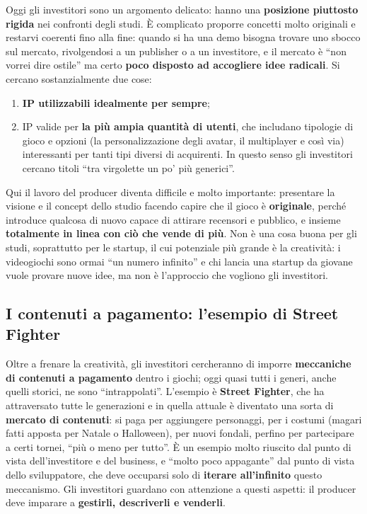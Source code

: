 Oggi gli investitori sono un argomento delicato: hanno una \textbf{posizione
piuttosto rigida} nei confronti degli studi. È complicato proporre concetti
molto originali e restarvi coerenti fino alla fine: quando si ha una demo
bisogna trovare uno sbocco sul mercato, rivolgendosi a un publisher o a un
investitore, e il mercato è ``non vorrei dire ostile'' ma certo \textbf{poco
disposto ad accogliere idee radicali}. Si cercano sostanzialmente due cose:
\begin{enumerate}
  \item \textbf{IP utilizzabili idealmente per sempre};
  \item IP valide per \textbf{la più ampia quantità di utenti}, che includano
        tipologie di gioco e opzioni (la personalizzazione degli avatar, il
        multiplayer e così via) interessanti per tanti tipi diversi di
        acquirenti. In questo senso gli investitori cercano titoli ``tra
        virgolette un po' più generici''.
\end{enumerate}
Qui il lavoro del producer diventa difficile e molto importante: presentare la
visione e il concept dello studio facendo capire che il gioco è
\textbf{originale}, perché introduce qualcosa di nuovo capace di attirare
recensori e pubblico, e insieme \textbf{totalmente in linea con ciò che vende di
più}. Non è una cosa buona per gli studi, soprattutto per le startup, il cui
potenziale più grande è la creatività: i videogiochi sono ormai ``un numero
infinito'' e chi lancia una startup da giovane vuole provare nuove idee, ma non è
l'approccio che vogliono gli investitori.

\subsection{I contenuti a pagamento: l'esempio di Street Fighter}

Oltre a frenare la creatività, gli investitori cercheranno di imporre
\textbf{meccaniche di contenuti a pagamento} dentro i giochi; oggi quasi tutti i
generi, anche quelli storici, ne sono ``intrappolati''. L'esempio è
\textbf{Street Fighter}, che ha attraversato tutte le generazioni e in quella
attuale è diventato una sorta di \textbf{mercato di contenuti}: si paga per
aggiungere personaggi, per i costumi (magari fatti apposta per Natale o
Halloween), per nuovi fondali, perfino per partecipare a certi tornei, ``più o
meno per tutto''. È un esempio molto riuscito dal punto di vista
dell'investitore e del business, e ``molto poco appagante'' dal punto di vista
dello sviluppatore, che deve occuparsi solo di \textbf{iterare all'infinito}
questo meccanismo. Gli investitori guardano con attenzione a questi aspetti: il
producer deve imparare a \textbf{gestirli, descriverli e venderli}.

